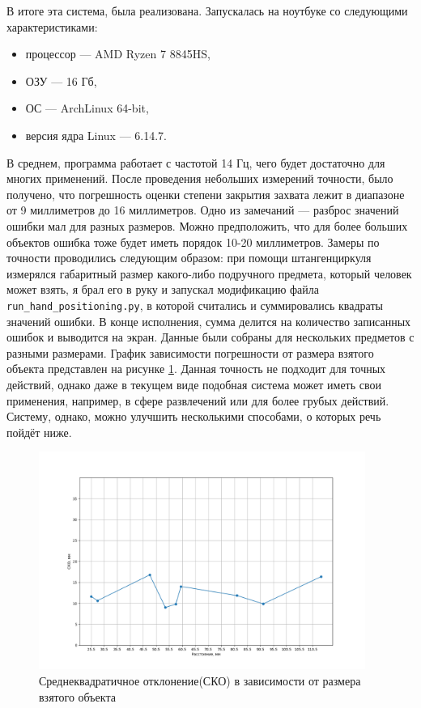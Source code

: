 \documentclass[14pt, a4paper]{extarticle}
\begin{document}
В итоге эта система, была реализована. Запускалась на ноутбуке со следующими
характеристиками:
\begin{itemize}
  \item процессор --- AMD Ryzen 7 8845HS,
  \item ОЗУ --- 16 Гб,
  \item ОС --- ArchLinux 64-bit,
  \item версия ядра Linux --- 6.14.7.
\end{itemize}
В среднем, программа работает с частотой 14 Гц, чего будет достаточно для многих применений.
После проведения небольших измерений точности, было получено, что погрешность оценки
степени закрытия захвата лежит в диапазоне от 9 миллиметров до 16 миллиметров.
Одно из замечаний --- разброс значений ошибки мал для разных размеров. Можно
предположить, что для более больших объектов ошибка тоже будет иметь порядок
10-20 миллиметров. Замеры по точности проводились следующим образом: при помощи
штангенциркуля измерялся габаритный размер какого-либо подручного предмета,
который человек может взять, я брал его в руку и запускал модификацию файла
\texttt{run\_hand\_positioning.py}, в которой считались и суммировались
квадраты значений ошибки. В конце исполнения, сумма делится на количество
записанных ошибок и выводится на экран. Данные были собраны для нескольких
предметов с разными размерами. График зависимости погрешности от размера
взятого объекта представлен на рисунке \ref{fig:error-plot}. Данная точность не
подходит для точных действий, однако даже в текущем виде подобная система может
иметь свои применения, например, в сфере развлечений или для более грубых
действий. Систему, однако, можно улучшить несколькими способами, о которых речь
пойдёт ниже.
\begin{figure}
  \begin{center}
    \includegraphics[width=0.95\textwidth]{images/error-plot.png}
  \end{center}
  \caption{Среднеквадратичное отклонение(СКО) в зависимости от размера взятого объекта}\label{fig:error-plot}
\end{figure}
\end{document}
